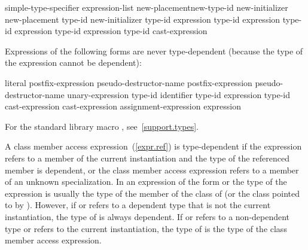 \begin{ncbnftab}
simple-type-specifier \terminal{(} expression-list\opt{} \terminal{)}\br
{} new-placement\opt new-type-id new-initializer\opt\br
{} new-placement\opt{} \terminal{(} type-id \terminal{)} new-initializer\opt\br
{} type-id \terminal{> (} expression \terminal{)}\br
{} type-id \terminal{> (} expression \terminal{)}\br
{} type-id \terminal{> (} expression \terminal{)}\br
{} type-id \terminal{> (} expression \terminal{)}\br
\terminal{(} type-id \terminal{)} cast-expression
\end{ncbnftab}

\pnum
Expressions of the following forms are never type-dependent (because the type
of the expression cannot be dependent):

\begin{ncbnftab}
literal\br
postfix-expression  pseudo-destructor-name\br
postfix-expression \terminal{->} pseudo-destructor-name\br
{} unary-expression\br
{} type-id \terminal{)}\br
{}  \terminal{(} identifier \terminal{)}\br
{} type-id \terminal{)}\br
{} expression \terminal{)}\br
{} type-id \terminal{)}\br
{} cast-expression\br
{} cast-expression\br
{} assignment-expression\opt\br
{} \terminal{(} expression \terminal{)}
\end{ncbnftab}

\enternote For the standard library macro ,
see~\ref{support.types}.\exitnote

\pnum
A class member access expression~(\ref{expr.ref}) is
type-dependent if
the expression refers to a member of the current instantiation and
the type of the referenced member is dependent, or the class member access
expression refers to a member of an unknown specialization.
\enternote
In an expression of the form
or
the type of the expression is usually the type of the member
of the class of
(or the class pointed to by
).
However, if
or
refers to a dependent type that is not the current instantiation,
the type of
is always dependent. If
or 
refers to a non-dependent type or refers to the current instantiation, the
type of
is the type of the class member access expression.
\exitnote


